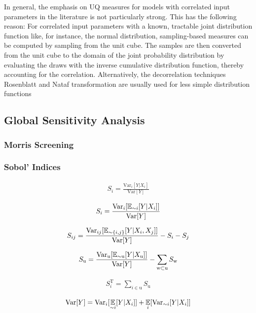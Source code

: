 In general, the emphasis on UQ measures for models with correlated input parameters in the literature is not particularly strong.
This has the following reason: For correlated input parameters with a known, tractable joint distribution function like, for instance, the normal distribution, sampling-based measures can be computed by sampling from the unit cube. The samples are then converted from the unit cube to the domain of the joint probability distribution by evaluating the draws with the inverse cumulative distribution function, thereby accounting for the correlation. Alternatively, the decorrelation techniques Rosenblatt and Nataf transformation are usually used for less simple distribution functions



\subsection{Global Sensitivity Analysis}
\subsubsection{Morris Screening}

\subsubsection{Sobol' Indices}

\begin{align}
S_i = \frac{\text{Var}_i[Y|X_i ]}{\text{Var}[Y]}
\end{align}

\begin{align}
S_i = \frac{\text{Var}_i[\operatorname*{\mathbb{E}}_{\sim i}[Y|X_i ]]}{\text{Var}[Y]}
\end{align}

\begin{align}
S_{ij} = \frac{\text{Var}_{ij}[\operatorname*{\mathbb{E}}_{\sim \{i,j\}}[Y|X_i, X_j ]]}{\text{Var}[Y]} - S_i - S_j
\end{align}

\begin{align}
S_\text{u} = \frac{\text{Var}_\text{u}[\operatorname*{\mathbb{E}}_{\sim \text{u}}[Y|X_\text{u} ]]}{\text{Var}[Y]} - \sum_{\text{w} \subset \text{u}} S_\text{w}
\end{align}

\begin{align}
S_i^\text{T} = \sum_{i \in \text{u}} S_\text{u}
\end{align}

\begin{align}
\text{Var}[Y] = \text{Var}_i[\operatorname*{\mathbb{E}}_{\sim i}[Y|X_i]] + \operatorname*{\mathbb{E}}_{i}[\text{Var}_{\sim i}[Y|X_i]]
\end{align}

